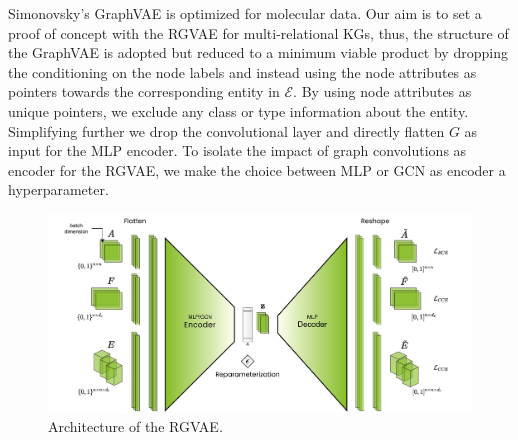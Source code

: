 {{Simonovsky's GraphVAE \cite{simonovsky_graphvae_2018} is optimized for molecular data. Our aim is to set a proof of concept with the RGVAE for multi-relational KGs, thus, the structure of the GraphVAE is adopted but reduced to a minimum viable product by dropping the conditioning on the node labels and instead using the node attributes as pointers towards the corresponding entity in $\mathcal{E}$. By using node attributes as unique pointers, we exclude any class or type information about the entity. Simplifying further we drop the convolutional layer and directly flatten $G$ as input for the MLP encoder. To isolate the impact of graph convolutions as encoder for the RGVAE, we make the choice between MLP or GCN as encoder a hyperparameter.  


\begin{figure}[H]
    \centering
    \includegraphics[scale=0.6,page=1]{data/images/rgvae_diagFull2.pdf}
    \caption{Architecture of the RGVAE.}
    \label{fig3:GVAE}
\end{figure}






}}
